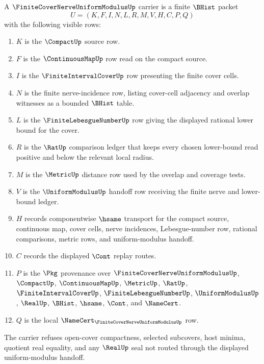 \begin{definition}
\label{def:finite-cover-nerve-uniform-modulus-carrier}
A $\FiniteCoverNerveUniformModulusUp$ carrier is a finite $\BHist$ packet
$$
U=(K,F,I,N,L,R,M,V,H,C,P,Q)
$$
with the following visible rows:
\begin{enumerate}
\item $K$ is the $\CompactUp$ source row.
\item $F$ is the $\ContinuousMapUp$ row read on the compact source.
\item $I$ is the $\FiniteIntervalCoverUp$ row presenting the finite cover cells.
\item $N$ is the finite nerve-incidence row, listing cover-cell adjacency and overlap witnesses as a bounded $\BHist$ table.
\item $L$ is the $\FiniteLebesgueNumberUp$ row giving the displayed rational lower bound for the cover.
\item $R$ is the $\RatUp$ comparison ledger that keeps every chosen lower-bound read positive and below the relevant local radius.
\item $M$ is the $\MetricUp$ distance row used by the overlap and coverage tests.
\item $V$ is the $\UniformModulusUp$ handoff row receiving the finite nerve and lower-bound ledger.
\item $H$ records componentwise $\hsame$ transport for the compact source, continuous map, cover cells, nerve incidences, Lebesgue-number row, rational comparisons, metric rows, and uniform-modulus handoff.
\item $C$ records the displayed $\Cont$ replay routes.
\item $P$ is the $\Pkg$ provenance over $\FiniteCoverNerveUniformModulusUp$, $\CompactUp$, $\ContinuousMapUp$, $\MetricUp$, $\RatUp$, $\FiniteIntervalCoverUp$, $\FiniteLebesgueNumberUp$, $\UniformModulusUp$, $\RealUp$, $\BHist$, $\hsame$, $\Cont$, and $\NameCert$.
\item $Q$ is the local $\NameCert_{\FiniteCoverNerveUniformModulusUp}$ row.
\end{enumerate}
The carrier refuses open-cover compactness, selected subcovers, host minima, quotient real equality, and any $\RealUp$ seal not routed through the displayed uniform-modulus handoff.
\end{definition}

